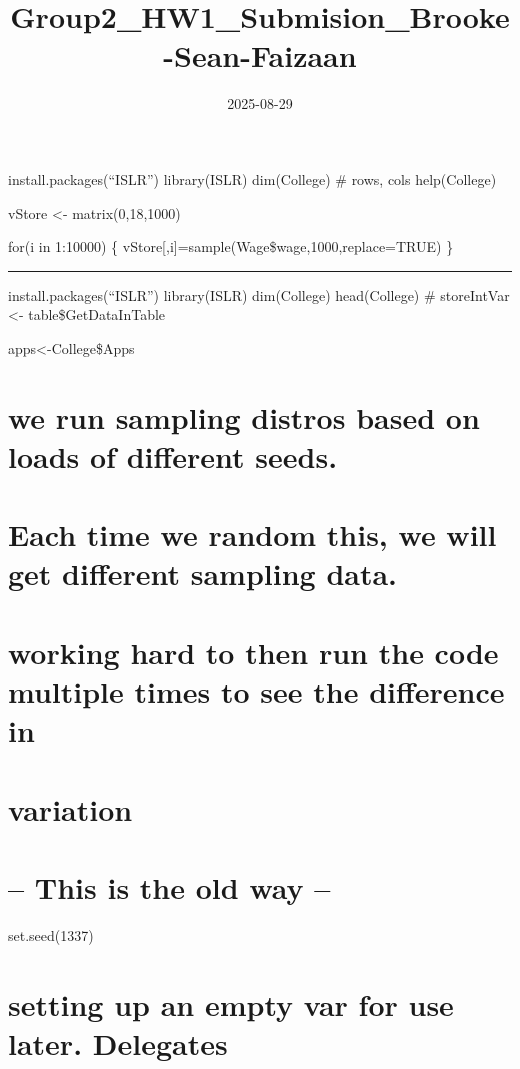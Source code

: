 \documentclass[
]{article}
\title{Group2\_HW1\_Submision\_Brooke-Sean-Faizaan}
\author{}
\date{\vspace{-2.5em}2025-08-29}
\begin{document}
\maketitle

install.packages(``ISLR'') library(ISLR) dim(College) \# rows, cols
help(College)

vStore \textless- matrix(0,18,1000)

for(i in 1:10000) \{ vStore{[},i{]}=sample(Wage\$wage,1000,replace=TRUE)
\}

\begin{center}\rule{0.5\linewidth}{0.5pt}\end{center}

install.packages(``ISLR'') library(ISLR) dim(College) head(College) \#
storeIntVar \textless- table\$GetDataInTable

apps\textless-College\$Apps

\section{we run sampling distros based on loads of different
seeds.}\label{we-run-sampling-distros-based-on-loads-of-different-seeds.}

\section{Each time we random this, we will get different sampling
data.}\label{each-time-we-random-this-we-will-get-different-sampling-data.}

\section{working hard to then run the code multiple times to see the
difference
in}\label{working-hard-to-then-run-the-code-multiple-times-to-see-the-difference-in}

\section{variation}\label{variation}

\section{-- This is the old way --}\label{this-is-the-old-way}

set.seed(1337)

\section{setting up an empty var for use later.
Delegates}\label{setting-up-an-empty-var-for-use-later.-delegates}
\end{document}
